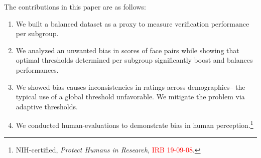 The contributions in this paper are as follows:
\begin{enumerate}
    \item We built a balanced dataset as a proxy to measure verification performance per subgroup.
    \item We analyzed an unwanted bias in scores of face pairs while showing that optimal thresholds determined per subgroup significantly boost and balances performances.
    \item We showed bias causes inconsistencies in ratings across demographics-- the typical use of a global threshold unfavorable. We mitigate the problem via adaptive thresholds.
    \item We conducted human-evaluations to demonstrate bias in human perception.\footnote{NIH-certified, \textit{Protect Humans in Research}, \textcolor{red}{IRB 19-09-08}.}
\end{enumerate}

